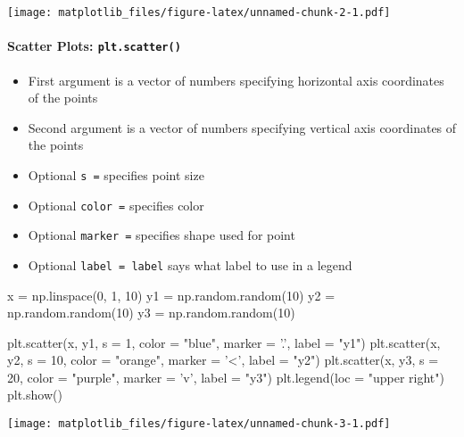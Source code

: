 \documentclass[]{extarticle}
\newenvironment{Shaded}{\begin{snugshade}}{\end{snugshade}}
\newcommand{\DecValTok}[1]{\textcolor[rgb]{0.86,0.86,0.80}{#1}}
\newcommand{\NormalTok}[1]{\textcolor[rgb]{0.80,0.80,0.80}{#1}}
\newcommand{\OperatorTok}[1]{\textcolor[rgb]{0.94,0.94,0.82}{#1}}
\newcommand{\StringTok}[1]{\textcolor[rgb]{0.80,0.58,0.58}{#1}}
\providecommand{\tightlist}{%
  \setlength{\itemsep}{0pt}\setlength{\parskip}{0pt}}
\let\oldparagraph\paragraph
\renewcommand{\paragraph}[1]{\oldparagraph{#1}\mbox{}}
\begin{document}
\texttt{[image: matplotlib\_files/figure-latex/unnamed-chunk-2-1.pdf]}

\hypertarget{scatter-plots-plt.scatter}{%
\paragraph{\texorpdfstring{Scatter Plots:
\texttt{plt.scatter()}}{Scatter Plots: plt.scatter()}}\label{scatter-plots-plt.scatter}}

\begin{itemize}
\tightlist
\item
  First argument is a vector of numbers specifying horizontal axis
  coordinates of the points
\item
  Second argument is a vector of numbers specifying vertical axis
  coordinates of the points
\item
  Optional \texttt{s\ =} specifies point size
\item
  Optional \texttt{color\ =} specifies color
\item
  Optional \texttt{marker\ =} specifies shape used for point
\item
  Optional \texttt{label\ =\ \textquotesingle{}label\textquotesingle{}}
  says what label to use in a legend
\end{itemize}

\begin{Shaded}
\begin{Highlighting}[]
\NormalTok{x }\OperatorTok{=}\NormalTok{ np.linspace(}\DecValTok{0}\NormalTok{, }\DecValTok{1}\NormalTok{, }\DecValTok{10}\NormalTok{)}
\NormalTok{y1 }\OperatorTok{=}\NormalTok{ np.random.random(}\DecValTok{10}\NormalTok{)}
\NormalTok{y2 }\OperatorTok{=}\NormalTok{ np.random.random(}\DecValTok{10}\NormalTok{)}
\NormalTok{y3 }\OperatorTok{=}\NormalTok{ np.random.random(}\DecValTok{10}\NormalTok{)}

\NormalTok{plt.scatter(x, y1, s }\OperatorTok{=} \DecValTok{1}\NormalTok{, color }\OperatorTok{=} \StringTok{"blue"}\NormalTok{, marker }\OperatorTok{=} \StringTok{'.'}\NormalTok{, label }\OperatorTok{=} \StringTok{"y1"}\NormalTok{)}
\NormalTok{plt.scatter(x, y2, s }\OperatorTok{=} \DecValTok{10}\NormalTok{, color }\OperatorTok{=} \StringTok{"orange"}\NormalTok{, marker }\OperatorTok{=} \StringTok{'<'}\NormalTok{, label }\OperatorTok{=} \StringTok{"y2"}\NormalTok{)}
\NormalTok{plt.scatter(x, y3, s }\OperatorTok{=} \DecValTok{20}\NormalTok{, color }\OperatorTok{=} \StringTok{"purple"}\NormalTok{, marker }\OperatorTok{=} \StringTok{'v'}\NormalTok{, label }\OperatorTok{=} \StringTok{"y3"}\NormalTok{)}
\NormalTok{plt.legend(loc }\OperatorTok{=} \StringTok{"upper right"}\NormalTok{)}
\NormalTok{plt.show()}
\end{Highlighting}
\end{Shaded}

\texttt{[image: matplotlib\_files/figure-latex/unnamed-chunk-3-1.pdf]}
\end{document}

